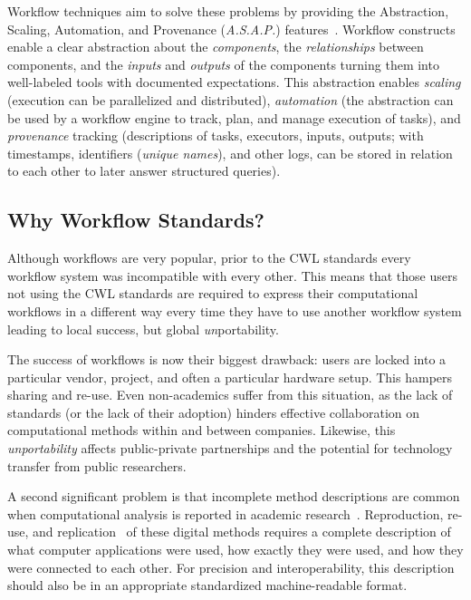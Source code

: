 Workflow techniques aim to solve these problems by providing the Abstraction, Scaling, Automation, and Provenance (\textit{A.S.A.P.}) features~\cite{cuevasvicenttn_2012}.  Workflow constructs enable a clear abstraction about the \textit{components}, the \textit{relationships} between components, and the \textit{inputs} and \textit{outputs} of the components turning them into well-labeled tools with documented expectations. This abstraction enables \textit{scaling} (execution can be parallelized and distributed), \textit{automation} (the abstraction can be used by a workflow engine to track, plan, and manage execution of tasks), and \textit{provenance} tracking (descriptions of tasks, executors, inputs, outputs; with timestamps, identifiers (\textit{unique names}), and other logs, can be stored in relation to each other to later answer structured queries).

\subsection{Why Workflow Standards?}\label{sec:bg:standard}

Although workflows are very popular, prior to the CWL standards every workflow system was incompatible with every other. This means that those users not using the CWL standards are required to express their computational workflows in a different way every time they have to use another workflow system leading to local success, but global \textit{un}portability.

The success of workflows is now their biggest drawback: users are locked into a particular vendor, project, and often a particular hardware setup. This hampers sharing and re-use. Even non-academics suffer from this situation, as the lack of standards (or the lack of their adoption) hinders effective collaboration on computational methods within and between companies. Likewise, this \textit{unportability} affects public-private partnerships and the potential for technology transfer from public researchers.

A second significant problem is that incomplete method descriptions are common when computational analysis is reported in academic research~\cite{Ivie2018}. Reproduction, re-use, and replication~\cite{feitelson_repeatability_2015} of these digital methods requires a complete description of what computer applications were used, how exactly they were used, and how they were connected to each other. For precision and interoperability, this description should also be in an appropriate standardized machine-readable format.

